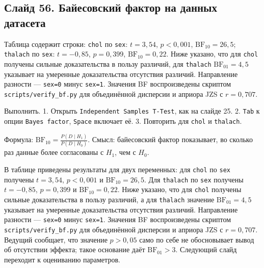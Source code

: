 \documentclass[11pt,a4paper]{article}
\begin{document}
\subsection*{Слайд 56. Байесовский фактор на данных датасета}
\begin{onslide}
Таблица содержит строки: \texttt{chol} по \texttt{sex}: $t = 3{,}54$, $p < 0{,}001$, $\mathrm{BF}_{10} = 26{,}5$; \texttt{thalach} по \texttt{sex}: $t = -0{,}85$, $p = 0{,}399$, $\mathrm{BF}_{10} = 0{,}22$. Ниже указано, что для \texttt{chol} получены сильные доказательства в пользу различий, для \texttt{thalach} $\mathrm{BF}_{01} = 4{,}5$ указывает на умеренные доказательства отсутствия различий. Направление разности — \texttt{sex=0} минус \texttt{sex=1}. Значения BF воспроизведены скриптом \texttt{scripts/verify\_bf.py} для объединённой дисперсии и априора JZS с $r = 0{,}707$.
\end{onslide}
\begin{jamovi}
Выполнить. 1. Открыть \texttt{Independent Samples T-Test}, как на слайде 25. 2. \texttt{Tab} к опции \texttt{Bayes factor}, \texttt{Space} включает её. 3. Повторить для \texttt{chol} и \texttt{thalach}.
\par Формула: $\mathrm{BF}_{10}=\frac{P(D\mid H_1)}{P(D\mid H_0)}$. Смысл: байесовский фактор показывает, во сколько раз данные более согласованы с $H_1$, чем с $H_0$.
\end{jamovi}
В таблице приведены результаты для двух переменных: для \texttt{chol} по \texttt{sex} получены $t = 3{,}54$, $p < 0{,}001$ и $\mathrm{BF}_{10} = 26{,}5$. Для \texttt{thalach} по \texttt{sex} получены $t = -0{,}85$, $p = 0{,}399$ и $\mathrm{BF}_{10} = 0{,}22$. Ниже указано, что для \texttt{chol} получены сильные доказательства в пользу различий, а для \texttt{thalach} значение $\mathrm{BF}_{01} = 4{,}5$ указывает на умеренные доказательства отсутствия различий. Направление разности — \texttt{sex=0} минус \texttt{sex=1}. Значения BF воспроизведены скриптом \texttt{scripts/verify\_bf.py} для объединённой дисперсии и априора JZS с $r = 0{,}707$. Ведущий сообщает, что значение $p > 0{,}05$ само по себе не обосновывает вывод об отсутствии эффекта; такое основание даёт $\mathrm{BF}_{01} > 3$. Следующий слайд переходит к оцениванию параметров.
\end{document}
